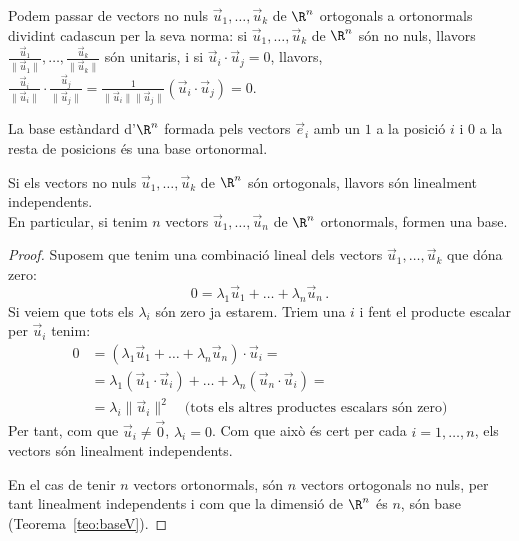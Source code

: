 \begin{observacio}
Podem passar de vectors no nuls $\vec u_1, \dots, \vec u_k$ de $\R^n$ ortogonals a ortonormals dividint cadascun per la seva norma: si $\vec u_1, \dots, \vec u_k$ de $\R^n$ són no nuls, llavors $\frac{\vec u_1}{\|\vec u_1\|}, \dots, \frac{\vec u_k}{\|\vec u_k\|}$ són unitaris, i si $\vec u_i\cdot \vec u_j=0$, llavors, $\frac{\vec u_i}{\|\vec u_i\|}\cdot \frac{\vec u_j}{\|\vec u_j\|}=\frac{1}{\|\vec u_i\| \|\vec u_j\|}(\vec u_i\cdot \vec u_j)=0$.
\end{observacio}
\begin{exemple}
La base estàndard d'$\R^n$ formada pels vectors $\vec e_i$ amb un $1$ a la posició $i$ i $0$ a la resta de posicions és una base ortonormal.
\end{exemple}
\begin{lema}
Si els vectors no nuls $\vec u_1, \dots, \vec u_k$ de $\R^n$ són ortogonals, llavors són linealment independents.\\
En particular, si tenim $n$ vectors $\vec u_1, \dots, \vec u_n$ de $\R^n$ ortonormals, formen una base.
\end{lema}
\begin{proof}
Suposem que tenim una combinació lineal dels vectors $\vec u_1, \dots, \vec u_k$ que dóna zero:
$$
0 = \lambda_1 \vec u_1 + \dots + \lambda_n\vec u_n \,.
$$
Si veiem que tots els $\lambda_i$ són zero ja estarem. Triem una $i$ i fent el producte escalar per $\vec u_i$ tenim:
\begin{align*}
    0 &  = (\lambda_1 \vec u_1 + \dots + \lambda_n\vec u_n)\cdot \vec u_i= \\
     & = \lambda_1 (\vec u_1 \cdot \vec u_i) + \dots + \lambda_n(\vec u_n\cdot \vec u_i)=\\
     & = \lambda_i \|\vec u_i\|^2\quad \text{(tots els altres productes escalars són zero)}
\end{align*}
Per tant, com que $\vec u_i\neq\vec 0$, $\lambda_i=0$. Com que això és cert per cada $i=1,\ldots,n$, els vectors són linealment independents.

En el cas de tenir $n$ vectors ortonormals, són $n$ vectors ortogonals no nuls, per tant linealment independents i com que la dimensió de $\R^n$ és $n$, són base (Teorema~\ref{teo:baseV}).
\end{proof}



